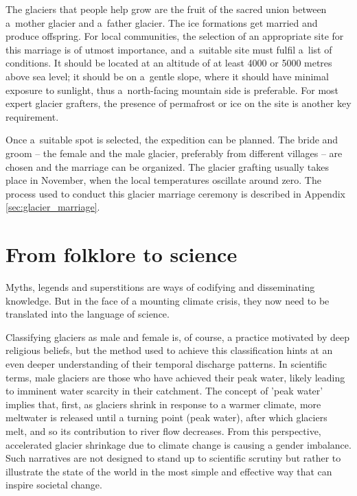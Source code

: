 The glaciers that people help grow are the fruit of the sacred union between a mother glacier and a father
glacier. The ice formations get married and produce offspring. For local communities, the selection of an
appropriate site for this marriage is of utmost importance, and a suitable site must fulfil a list of
conditions. It should be located at an altitude of at least 4000 or 5000 metres above sea level; it should be on
a gentle slope, where it should have minimal exposure to sunlight, thus a north-facing mountain side is
preferable. For most expert glacier grafters, the presence of permafrost or ice on the site is another key
requirement. 

Once a suitable spot is selected, the expedition can be planned. The bride and groom – the female and the male
glacier, preferably from different villages – are chosen and the marriage can be organized. The glacier grafting
usually takes place in November, when the local temperatures oscillate around zero. The process used to conduct
this glacier marriage ceremony is described in Appendix \ref{sec:glacier_marriage}.

\section{From folklore to science}

Myths, legends and superstitions are ways of codifying and disseminating knowledge. But in the face of a
mounting climate crisis, they now need to be translated into the language of science. 


Classifying glaciers as male and female is, of course, a practice motivated by deep religious beliefs, but the
method used to achieve this classification hints at an even deeper understanding of their temporal discharge
patterns. In scientific terms, male glaciers are those who have achieved their peak water, likely leading to
imminent water scarcity in their catchment. The concept of 'peak water' implies that, first, as glaciers shrink
in response to a warmer climate, more meltwater is released until a turning point (peak water), after which
glaciers melt, and so its contribution to river flow decreases.  From this perspective, accelerated glacier
shrinkage due to climate change is causing a gender imbalance.  Such narratives are not designed to stand up to
scientific scrutiny but rather to illustrate the state of the world in the most simple and effective way that
can inspire societal change. 

